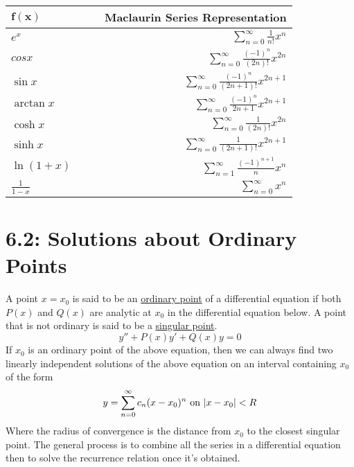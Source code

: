 \documentclass{article}
\begin{document}
\begin{tabularx}{\textwidth}{l X X r}
\toprule
\(\bm{f(x)}\) &&& \textbf{Maclaurin Series Representation} \\
\midrule
\(e^x\) &&& \(\sum\limits_{n=0}^\infty\frac{1}{n!}x^n\) \\
\(cos x\) &&& \(\sum\limits_{n=0}^\infty\frac{(-1)^n}{(2n)!}x^{2n}\) \\
\(\sin x\) &&& \(\sum\limits_{n=0}^\infty\frac{(-1)^n}{(2n+1)!}x^{2n+1}\) \\
\(\arctan x\) &&& \(\sum\limits_{n=0}^\infty\frac{(-1)^n}{2n+1}x^{2n+1}\) \\
\(\cosh x\) &&& \(\sum\limits_{n=0}^\infty\frac{1}{(2n)!}x^{2n}\) \\
\(\sinh x\) &&& \(\sum\limits_{n=0}^\infty\frac{1}{(2n+1)!}x^{2n+1}\) \\
\(\ln(1+x)\) &&& \(\sum\limits_{n=1}^\infty\frac{(-1)^{n+1}}{n}x^{n}\) \\
\(\frac{1}{1-x}\) &&& \(\sum\limits_{n=0}^\infty x^n\) \\
\bottomrule
\end{tabularx}
\section*{6.2: Solutions about Ordinary Points}
A point \(x=x_0\) is said to be an \underline{ordinary point} of a differential equation if both \(P(x)\) and \(Q(x)\) are analytic at \(x_0\) in the differential equation below. A point that is not ordinary is said to be a \underline{singular point}.
\[y''+P(x)y'+Q(x)y=0\]
If \(x_0\) is an ordinary point of the above equation, then we can always find two linearly independent solutions of the above equation on an interval containing \(x_0\) of the form
\[y=\sum_{n=0}^\infty c_n(x-x_0)^n\textnormal{ on }|x-x_0|<R\]
Where the radius of convergence is the distance from \(x_0\) to the closest singular point. The general process is to combine all the series in a differential equation then to solve the recurrence relation once it's obtained.
\end{document}
